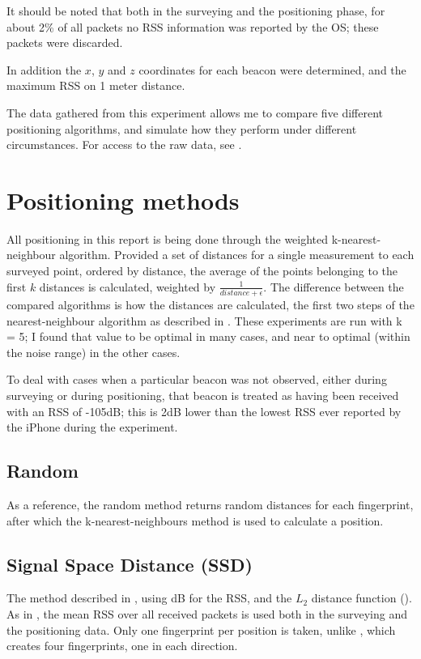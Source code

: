 It should be noted that both in the surveying and the positioning phase, for about 2\% of all packets no RSS information was reported by the OS; these packets were discarded.

In addition the $x$, $y$ and $z$ coordinates for each beacon were determined, and the maximum RSS on 1 meter distance.

The data gathered from this experiment allows me to compare five different positioning algorithms, and simulate how they perform under different circumstances.
For access to the raw data, see .

\section{Positioning methods}

All positioning in this report is being done through the weighted k-nearest-neighbour algorithm.
Provided a set of distances for a single measurement to each surveyed point, ordered by distance, the average of the points belonging to the first $k$ distances is calculated, weighted by $\frac{1}{distance+\epsilon}$.
The difference between the compared algorithms is how the distances are calculated, the first two steps of the nearest-neighbour algorithm as described in .
These experiments are run with k = 5; I found that value to be optimal in many cases, and near to optimal (within the noise range) in the other cases.

To deal with cases when a particular beacon was not observed, either during surveying or during positioning, that beacon is treated as having been received with an RSS of -105dB; this is 2dB lower than the lowest RSS ever reported by the iPhone during the experiment.

\subsection{Random}
As a reference, the random method returns random distances for each fingerprint, after which the k-nearest-neighbours method is used to calculate a position.

\subsection{Signal Space Distance (SSD)}
The method described in \citet{bahl2000radar}, using dB for the RSS, and the $L_2$ distance function ().
As in \citet{bahl2000radar}, the mean RSS over all received packets is used both in the surveying and the positioning data.
Only one fingerprint per position is taken, unlike \citet{bahl2000radar}, which creates four fingerprints, one in each direction.

